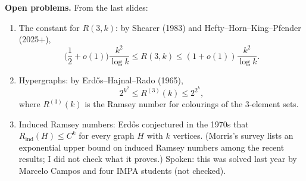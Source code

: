 \medskip\noindent
{\bf Open problems.} From the last slides:
\begin{enumerate}
\item The constant for $R(3,k)$: by Shearer
(1983) and Hefty--Horn--King--Pfender
(2025+),
$$
\Big(\frac{1}{2} + o(1)\Big)
\frac{k^2}{\log k}
\le R(3,k) \le
(1 + o(1))\frac{k^2}{\log k}.
$$
\item Hypergraphs: by Erd\H{o}s--Hajnal--Rado
(1965),
$$
2^{k^2} \le R^{(3)}(k) \le 2^{2^k},
$$
where $R^{(3)}(k)$ is the Ramsey number for
colourings of the $3$-element sets.
\item Induced Ramsey numbers: Erd\H{o}s
conjectured in the 1970s that
$R_{\mathrm{ind}}(H) \le C^k$ for every
graph $H$ with $k$ vertices. (Morris's survey
lists an exponential upper bound on induced
Ramsey numbers among the recent results; I
did not check what it proves.) Spoken:
this was solved last year by Marcelo Campos
and four IMPA students (not checked).
\end{enumerate}

